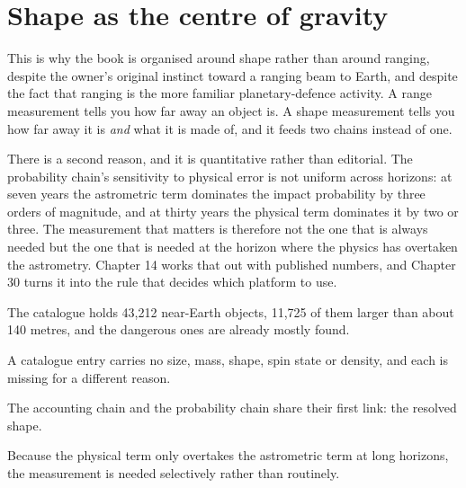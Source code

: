 \section{Shape as the centre of gravity}

This is why the book is organised around shape rather than around ranging,
despite the owner's original instinct toward a ranging beam to Earth, and
despite the fact that ranging is the more familiar planetary-defence
activity. A range measurement tells you how far away an object is. A shape
measurement tells you how far away it is \emph{and} what it is made of, and
it feeds two chains instead of one.

There is a second reason, and it is quantitative rather than editorial. The
probability chain's sensitivity to physical error is not uniform across
horizons: at seven years the astrometric term dominates the impact
probability by three orders of magnitude, and at thirty years the physical
term dominates it by two or three. The measurement that matters is therefore
not the one that is always needed but the one that is needed at the horizon
where the physics has overtaken the astrometry. Chapter 14 works that out
with published numbers, and Chapter 30 turns it into the rule that decides
which platform to use.

\begin{keytakeaways}
\item The catalogue holds 43,212 near-Earth objects, 11,725 of them larger
than about 140 metres, and the dangerous ones are already mostly found.
\item A catalogue entry carries no size, mass, shape, spin state or density,
and each is missing for a different reason.
\item The accounting chain and the probability chain share their first link:
the resolved shape.
\item Because the physical term only overtakes the astrometric term at long
horizons, the measurement is needed selectively rather than routinely.
\end{keytakeaways}
